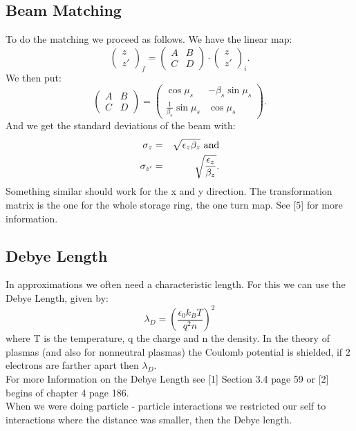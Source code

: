 \subsection{Beam Matching}
To do the matching we proceed as follows. We have the linear map:
\begin{equation}
\left( \begin{array}{c}z \\ z' \end{array} \right)_f =
\left( \begin{array}{cc} A & B \\ C & D \end{array} \right) \cdot
\left( \begin{array}{c}z \\ z' \end{array} \right)_i .
\end{equation}
We then put:
\begin{equation}
\left( \begin{array}{cc} A & B \\ C & D \end{array} \right) =
\left( \begin{array}{cc} \cos \mu_s & - \beta_s \sin \mu_s \\ 
\frac 1 {\beta_s} \sin \mu_s & \cos \mu_s \end{array} \right).
\end{equation}
And we get the standard deviations of the beam with:
\begin{eqnarray} \sigma_z &=& \sqrt{\epsilon_z \beta_z} \textnormal{ and}\\
\sigma_{z'} &=& \sqrt{\frac{\epsilon_z}{\beta_z}}.
\end{eqnarray}
Something similar should work for the x and y direction. The transformation matrix is the one for the whole storage ring, the one turn map. See [5] for more information.

\subsection{Debye Length}
In approximations we often need a characteristic length. For this we can use the Debye Length, given by:
\begin{equation} \lambda_D = \left(\frac{\epsilon_0 k_B T}{q^2 n} \right)^2 \end{equation}
where T is the temperature, q the charge and n the density. In the theory of plasmas (and also for nonneutral plasmas) the Coulomb potential is shielded, if 2 electrons are farther apart then $\lambda_D$.\\
For more Information on the Debye Length see [1] Section 3.4 page 59 or [2] begins of chapter 4 page 186.\\
When we were doing particle - particle interactions we restricted our self to interactions where the distance was smaller, then the Debye length.

